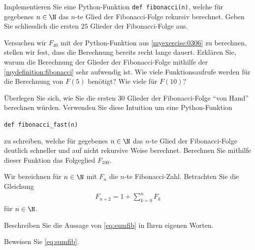 \clearpage

\begin{myexercise}\label{myexercise:0306}
Implementieren Sie eine Python-Funktion \lstinline|def fibonacci(n)|, welche für gegebenes $n\in\N$ das $n$-te Glied der Fibonacci-Folge rekursiv berechnet. Geben Sie schliesslich die ersten $25$ Glieder der Fibonacci-Folge aus.
\end{myexercise}

\begin{myexercise}\label{myexercise:0307}
Versuchen wir $F_{40}$ mit der Python-Funktion aus \cref{myexercise:0306} zu berechnen, stellen wir fest, dass die Berechnung bereits recht lange dauert. Erklären Sie, warum die Berechnung der Glieder der Fibonacci-Folge mithilfe der \cref{mydefinition:fibonacci} sehr aufwendig ist. Wie viele Funktionsaufrufe werden für die Berechnung von $F(5)$ benötigt? Wie viele für $F(10)$?
\end{myexercise}

\begin{myexercise}\label{myexercise:0358}
Überlegen Sie sich, wie Sie die ersten $30$ Glieder der Fibonacci-Folge \enquote{von Hand} berechnen würden. Verwenden Sie diese Intuition um eine Python-Funktion
\begin{center}
  \lstinline|def fibonacci_fast(n)|
\end{center}
zu schreiben, welche für gegebenes $n\in\N$ das $n$-te Glied der Fibonacci-Folge deutlich schneller und auf nicht rekursive Weise berechnet. Berechnen Sie mithilfe dieser Funktion das Folgeglied $F_{100}$.
\end{myexercise}

\begin{myexercise}\label{myexercise:0309}
Wir bezeichnen für $n\in\N$ mit $F_n$ die $n$-te Fibonacci-Zahl. Betrachten Sie die Gleichung
\begin{align}\label{eq:sumfib}
    F_{n+2} = 1 + \sum_{k=0}^{n} F_k
\end{align}
für $n\in\N$.
\begin{aenum}
    \item Beschreiben Sie die Aussage von \cref{eq:sumfib} in Ihren eigenen Worten.
    \item Beweisen Sie \cref{eq:sumfib}.
\end{aenum}
\end{myexercise}

\clearpage
